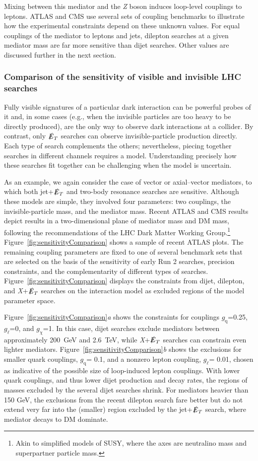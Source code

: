 \documentclass{ar-1col}
\newcommand{\chiDM}{\ensuremath{\chi}\xspace}
\newcommand{\IP}{invisible particle}
\newcommand{\gDM}{\ensuremath{g_{\chiDM}}\xspace}
\newcommand{\gdm}{\gDM}
\newcommand{\gl}{$g_{\ell}$\xspace}
\newcommand{\gq}{$g_{\mathrm{q}}$\xspace}
\newcommand{\MET}{\ensuremath{\slashed{E}_T}\xspace}
\begin{document}
Mixing between this mediator and the \textit{Z} boson induces loop-level
couplings to leptons. ATLAS and CMS use several sets of coupling
benchmarks to illustrate how the experimental constraints depend
on these unknown values. For equal couplings of the mediator to
leptons and jets, dilepton searches at a given mediator mass are
far more sensitive than dijet searches. Other values are
discussed further in the next section.

\subsubsection{Comparison of the sensitivity of visible and invisible LHC searches}\label{sub:comparisonVisibleInvisible}

Fully visible signatures of a particular dark interaction can be
powerful probes of it and, in some cases (e.g., when the {\IP}s
are too heavy to be directly produced), are the only way to observe
dark interactions at a collider. By contrast, only \MET
searches can observe invisible-particle production directly.
Each type of search complements the others; nevertheless, piecing
together searches in different channels requires a model.
Understanding precisely how these searches fit together can be
challenging when the model is uncertain.

As an example, we again consider the case of vector or
axial--vector mediators, to which both jet+\MET and two-body
resonance searches are sensitive. Although these models are simple,
they involved four parameters: two couplings, the invisible-particle
mass, and the mediator mass. Recent ATLAS and CMS results depict
results in a two-dimensional plane of mediator mass and DM
mass, following the recommendations of the LHC Dark Matter Working
Group.\footnote{Akin to simplified models of SUSY, where the axes
are neutralino mass and superpartner particle mass.}
Figure~\ref{fig:sensitivityComparison} shows a sample of
recent ATLAS plots. The remaining coupling parameters are
fixed to one of several benchmark sets that are selected on the basis of the
sensitivity of early Run 2 searches, precision constraints, and
the complementarity of different types of searches. Figure~\ref{fig:sensitivityComparison} displays the
constraints from dijet, dilepton, and \textit{X}+\MET searches on the
interaction model as excluded regions of the model
parameter space.

Figure~\ref{fig:sensitivityComparison}\textit{a} shows the constraints for couplings
\gq=0.25, \gl=0, and \gdm=1. In this case, dijet searches exclude
mediators between approximately 200~GeV and 2.6~TeV, while \textit{X}+\MET searches
can constrain even lighter mediators. Figure~\ref{fig:sensitivityComparison}\textit{b} shows the
exclusions for smaller quark couplings, \gq = 0.1, and a nonzero
lepton coupling, \gl = 0.01, chosen as indicative of the possible
size of loop-induced lepton couplings. With lower quark couplings,
and thus lower dijet production and decay rates, the regions of
masses excluded by the several dijet searches shrink. For
mediators heavier than 150 GeV, the exclusions from the recent
dilepton search fare better but do not extend very far into the
(smaller) region excluded by the jet+\MET search, where mediator
decays to DM dominate.
\end{document}
